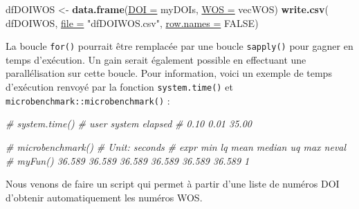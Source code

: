 \documentclass[twoside,symmetric]{book}
\newenvironment{Shaded}{}{}
\newcommand{\CommentTok}[1]{\textit{#1}}
\newcommand{\DataTypeTok}[1]{\underline{#1}}
\newcommand{\KeywordTok}[1]{\textbf{#1}}
\newcommand{\NormalTok}[1]{#1}
\newcommand{\OtherTok}[1]{#1}
\newcommand{\StringTok}[1]{#1}
\begin{document}
\begin{Shaded}
\begin{Highlighting}[]
\NormalTok{dfDOIWOS <-}\StringTok{ }\KeywordTok{data.frame}\NormalTok{(}\DataTypeTok{DOI =}\NormalTok{ myDOIs, }\DataTypeTok{WOS =}\NormalTok{ vecWOS)}
\KeywordTok{write.csv}\NormalTok{(}
\NormalTok{  dfDOIWOS, }
  \DataTypeTok{file =} \StringTok{"dfDOIWOS.csv"}\NormalTok{, }
  \DataTypeTok{row.names =} \OtherTok{FALSE}\NormalTok{)}
\end{Highlighting}
\end{Shaded}

La boucle \texttt{for()} pourrait être remplacée par une boucle \texttt{sapply()} pour gagner en temps d'exécution. Un gain serait également possible en effectuant une parallélisation sur cette boucle. Pour information, voici un exemple de temps d'exécution renvoyé par la fonction \texttt{system.time()} et \texttt{microbenchmark::microbenchmark()} :

\begin{Shaded}
\begin{Highlighting}[]
\CommentTok{# system.time()}
\CommentTok{#   user  system elapsed}
\CommentTok{#   0.10    0.01   35.00}

\CommentTok{# microbenchmark()}
\CommentTok{# Unit: seconds}
\CommentTok{#     expr    min     lq    mean median     uq    max neval}
\CommentTok{#  myFun() 36.589 36.589 36.589  36.589 36.589 36.589     1}
\end{Highlighting}
\end{Shaded}

Nous venons de faire un script qui permet à partir d'une liste de numéros DOI d'obtenir automatiquement les numéros WOS.
\end{document}
